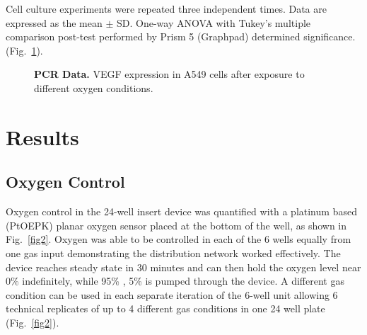 \documentclass[10pt,letterpaper]{article}
\begin{document}
Cell culture experiments were repeated three independent times. Data are expressed as the mean $\pm$ SD. One-way ANOVA with Tukey’s multiple comparison post-test performed by Prism 5 (Graphpad) determined significance. (Fig.~\ref{fig3}).

\begin{figure}[h]
\caption{
{\bf PCR Data.}  VEGF expression in A549 cells after exposure to different oxygen conditions.
}
\label{fig3}
\end{figure}



\section*{Results}
\subsection*{Oxygen Control}
Oxygen control in the 24-well insert device was quantified with a platinum based (PtOEPK) planar oxygen sensor placed at the bottom of the well, as shown in Fig.~\ref{fig2}.
Oxygen was able to be controlled in each of the 6 wells equally from one gas input demonstrating the distribution network worked effectively.
The device reaches steady state in 30 minutes and can then hold the oxygen level near 0\%  indefinitely, while 95\% , 5\%  is pumped through the device. 
A different gas condition can be used in each separate iteration of the 6-well unit allowing 6 technical replicates of up to 4 different gas conditions in one 24 well plate (Fig.~\ref{fig2}).
\end{document}
